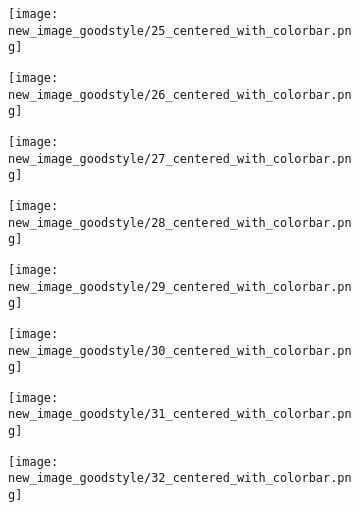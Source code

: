 \documentclass[a4paper,12pt]{article}
\begin{document}
\begin{figure}[H]
  \begin{subfigure}{0.11\textwidth}
    \texttt{[image: new\_image\_goodstyle/25\_centered\_with\_colorbar.png]}
  \end{subfigure}
  \hfill
  \begin{subfigure}{0.11\textwidth}
    \texttt{[image: new\_image\_goodstyle/26\_centered\_with\_colorbar.png]}
  \end{subfigure}
  \hfill
  \begin{subfigure}{0.11\textwidth}
    \texttt{[image: new\_image\_goodstyle/27\_centered\_with\_colorbar.png]}
  \end{subfigure}
  \hfill
  \begin{subfigure}{0.11\textwidth}
    \texttt{[image: new\_image\_goodstyle/28\_centered\_with\_colorbar.png]}
  \end{subfigure}
  \hfill
  \begin{subfigure}{0.11\textwidth}
    \texttt{[image: new\_image\_goodstyle/29\_centered\_with\_colorbar.png]}
  \end{subfigure}
  \hfill
  \begin{subfigure}{0.11\textwidth}
    \texttt{[image: new\_image\_goodstyle/30\_centered\_with\_colorbar.png]}
  \end{subfigure}
  \hfill
  \begin{subfigure}{0.11\textwidth}
    \texttt{[image: new\_image\_goodstyle/31\_centered\_with\_colorbar.png]}
  \end{subfigure}
  \hfill
  \begin{subfigure}{0.11\textwidth}
    \texttt{[image: new\_image\_goodstyle/32\_centered\_with\_colorbar.png]}
  \end{subfigure}
  \hfill
\end{figure}
\end{document}
